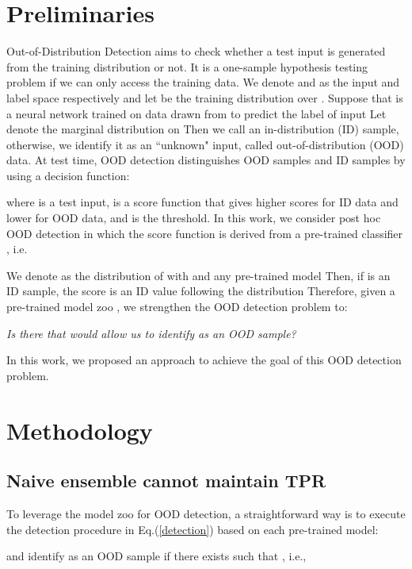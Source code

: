 \documentclass{article} \usepackage{iclr2023_conference,times}
\begin{document}
\section{Preliminaries}\label{Preliminaries}

Out-of-Distribution Detection aims to check whether a test input is generated from the training distribution or not. 
It is a one-sample hypothesis testing problem if we can only access the training data. 
We denote  and  as the input and label space respectively and let   be the training distribution over . 
Suppose that  is a neural network trained on data drawn from  to predict the label of input  
Let  denote the marginal distribution on  Then we call  an in-distribution (ID) sample, otherwise, we identify it as an ``unknown" input, called out-of-distribution (OOD) data. 
At test time, OOD detection distinguishes OOD samples and ID samples by using a decision function:

where  is a test input,  is a score function that gives higher scores for ID data and lower for OOD data, and  is the threshold. In this work, we consider post hoc OOD detection in which the score function  is derived from a pre-trained classifier , i.e.  

We denote  as the distribution of  with  and any pre-trained model 
Then, if  is an ID sample, the score  is an ID value following the distribution 
Therefore, given a pre-trained model zoo , we strengthen the OOD detection problem to:   
\begin{center}
    \it{ Is there  that would allow us to identify  as an OOD sample?} \end{center}
In this work, we proposed an approach to achieve the goal of this OOD detection problem. 


\section{Methodology}\label{Method}

\subsection{Naive ensemble cannot maintain TPR}\label{sec31}

To leverage the model zoo  for OOD detection, a straightforward way is to execute the detection procedure in Eq.(\ref{detection}) based on each pre-trained model:

and identify  as an OOD sample if there exists  such that , i.e., 
\end{document}
